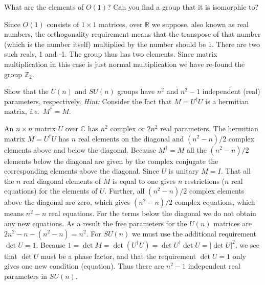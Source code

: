 \documentclass[notes.tex]{subfiles}
\begin{document}
\begin{Exercise}[]
What are the elements of $O(1)$? Can you find a group that it is isomorphic to?
\end{Exercise}
\begin{Answer}
Since $O(1)$ consists of $1\times1$ matrices, over $\mathbb R$ we suppose, also known as real numbers, the orthogonality requirement means that the transpose of that number (which is the number itself) multiplied by the number should be 1. There are two such reals, 1 and -1. The group thus has two elements. Since matrix multiplication in this case is just normal multiplication we have re-found the group $\mathbb Z_2$.
\end{Answer}

\begin{Exercise}[label=ex:Un_parameters]
Show that the $U(n)$ and $SU(n)$ groups have $n^2$ and $n^2-1$ independent (real) parameters, respectively. {\it Hint:} Consider the fact that $M=U^\dagger U$ is a hermitian matrix, {\it i.e.}\ $M^\dagger=M$.
\end{Exercise}
\begin{Answer}
An $n\times n$ matrix $U$ over $\mathbb C$ has $n^2$ complex or $2n^2$ real parameters. The hermitian matrix $M=U^\dagger U$ has $n$ real elements on the diagonal
and $(n^2-n)/2$ complex elements above and below the diagonal. Because $M^\dagger=M$ all the $(n^2-n)/2$ elements below the diagonal are given by the complex conjugate the corresponding elements above the diagonal. Since $U$ is unitary $M=I$. That all the $n$ real diagonal elements of $M$ is equal to one gives $n$ restrictions ($n$ real equations) for the elements of $U$. Further, all $(n^2-n)/2$ complex elements above the diagonal are zero, which gives $(n^2-n)/2$ complex equations, which means $n^2-n$ real equations. For the terms below the diagonal we do not obtain any new equations. As a result the free parameters for the $U(n)$ matrices are $2n^2-n-(n^2-n)=n^2$.
For $SU(n)$ we must use the additional requirement $\det U=1$. Because $1=\det M=\det (U^\dagger U)=\det U^\dagger \det U=|\det U|^2$, we see that $\det U$ must be a phase factor, and that the requirement $\det U=1$ only gives one new condition (equation). Thus there are $n^2-1$ independent real parameters in $SU(n)$.
\end{Answer}
\end{document}
